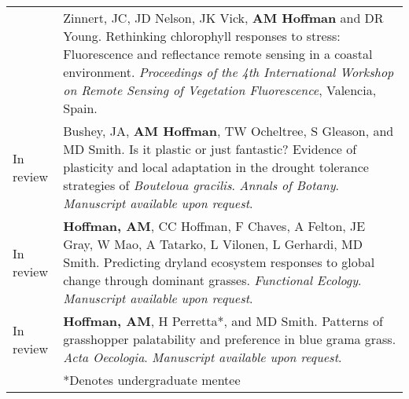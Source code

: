 \documentclass[letterpaper]{deedy-resume} %
\begin{document}
\begin{tabular}{>{\raggedleft\arraybackslash}p{2cm}p{16cm}}
2010 & Zinnert, JC, JD Nelson, JK Vick, \textbf{AM Hoffman} and DR Young. Rethinking chlorophyll responses to stress:  Fluorescence and reflectance remote sensing in a coastal environment.  \textit{Proceedings of the 4th International Workshop on Remote Sensing of Vegetation Fluorescence}, Valencia, Spain.\\






In review & Bushey, JA, \textbf{AM Hoffman}, TW Ocheltree, S Gleason, and MD Smith. Is it plastic or just fantastic? Evidence of plasticity and local adaptation in the drought tolerance strategies of \textit{Bouteloua gracilis}. \textcolor{special}{\textit{Annals of Botany}}. \textit{Manuscript available upon request}.\\

In review & \textbf{Hoffman, AM}, CC Hoffman, F Chaves, A Felton, JE Gray, W Mao, A Tatarko, L Vilonen, L Gerhardi, MD Smith. Predicting dryland ecosystem responses to global change through dominant grasses. \textcolor{special}{\textit{Functional Ecology}}. \textit{Manuscript available upon request}.\\

In review & \textbf{Hoffman, AM}, H Perretta*, and MD Smith. Patterns of grasshopper palatability and preference in blue grama grass. \textcolor{special}{\textit{Acta Oecologia}}. \textit{Manuscript available upon request}.\\

&*Denotes undergraduate mentee\\

\end{tabular}
\sectionspace
\end{document}
